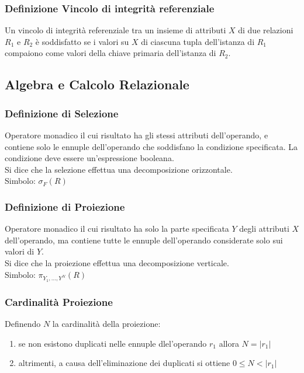 \subsubsection{Definizione Vincolo di integrità referenziale}
Un vincolo di integrità referenziale tra un insieme di attributi $X$ di due relazioni
$R_{1}$ e $R_{2}$ è soddisfatto se i valori su $X$ di ciascuna tupla dell'istanza di $R_{1}$
compaiono come valori della chiave primaria dell'istanza di $R_{2}$.

\subsection{Algebra e Calcolo Relazionale}

\subsubsection{Definizione di Selezione}
Operatore monadico il cui risultato ha gli stessi attributi dell'operando, e contiene solo
le ennuple dell'operando che soddisfano la condizione specificata. La condizione deve essere
un'espressione booleana. \\
Si dice che la selezione effettua una decomposizione orizzontale. \\
Simbolo: $\sigma_{F}(R)$

\subsubsection{Definizione di Proiezione}
Operatore monadico il cui risultato ha solo la parte specificata $Y$ degli attributi $X$ dell'operando,
ma contiene tutte le ennuple dell'operando considerate solo sui valori di $Y$. \\
Si dice che la proiezione effettua una decomposizione verticale. \\
Simbolo: $\pi_{Y_{1},...,Y^{N}}(R)$

\subsubsection{Cardinalità Proiezione}
Definendo $N$ la cardinalità della proiezione:

\begin{enumerate}
  \item se non esistono duplicati nelle ennuple dlel'operando $r_{1}$ allora $ N = \left\vert{r_{1}}\right\vert$
  \item altrimenti, a causa dell'eliminazione dei duplicati si ottiene $ 0 \leq N < \left\vert{r_{1}}\right\vert $
\end{enumerate}

